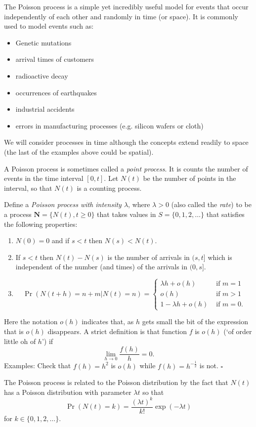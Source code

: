 \documentclass[11pt]{article}
\begin{document}
The Poisson process is a simple yet incredibly useful model for events that occur independently of each other and randomly in time (or space).    It is commonly used to model events such as:
\begin{itemize}
\item Genetic mutations
\item arrival times of customers
\item radioactive decay
\item occurrences of earthquakes
\item industrial accidents
\item errors in manufacturing processes (e.g. silicon wafers or cloth)
\end{itemize}
We will consider processes in time although the concepts extend readily to space (the last of the examples above could be spatial).

A Poisson process is sometimes called a {\em point process}.  It is counts the number of events in the time interval $[0,t]$.  Let $N(t)$ be the number of points in the interval, so that $N(t)$ is a counting process.

Define a {\em Poisson process with intensity $\lambda$}, where $\lambda > 0$ (also called the {\em rate}) to be a process $\mathbf N = \{ N(t), t \geq 0 \} $ that takes values in $S = \{0,1,2,\ldots \}$ that satisfies the following properties:
\begin{enumerate}
\item $N(0) = 0$ and if $s < t$ then $N(s) < N(t)$.
\item If $s < t$ then $N(t) - N(s)$ is the number of arrivals in $(s,t]$ which is independent of the number (and times) of the arrivals in $(0,s]$.
\item \[ \Pr(N(t+h) = n+m | N(t)  = n) = 
\begin{cases} \lambda h + o(h) & \mbox{ if } m = 1 \\
o(h) &  \mbox{ if } m >1 \\
 1 - \lambda h + o(h) &  \mbox{ if } m = 0.
 \end{cases}
\]
\end{enumerate}
Here the notation $o(h)$ indicates that, as $h$ gets small the bit of the expression that is $o(h)$ disappears.  A strict definition is that  function $f$ is $o(h)$ (`of order little oh of $h$') if \[ \lim_{h \rightarrow 0} \frac {f(h)}h = 0.\]
Examples: Check that $f(h) = h^2$ is $o(h)$ while $f(h) = h^{-\frac 12}$ is not. \hfill $\square$


The Poisson process is related to the Poisson distribution by the fact that $N(t)$ has a Poisson distribution with parameter $\lambda t$ so that \[\Pr(N(t) = k) = \frac{(\lambda t)^k}{k!} \exp(-\lambda t)\]
for $k \in \{0,1,2,\ldots\}$.  
\end{document}
